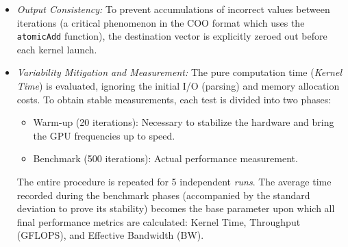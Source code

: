 \documentclass[conference]{IEEEtran}
\begin{document}
\begin{itemize}
    \item \textit{Output Consistency:} To prevent accumulations of incorrect values between iterations (a critical phenomenon in the COO format which uses the \texttt{atomicAdd} function), the destination vector is explicitly zeroed out before each kernel launch.
    
    \item \textit{Variability Mitigation and Measurement:} The pure computation time (\textit{Kernel Time}) is evaluated, ignoring the initial I/O (parsing) and memory allocation costs. To obtain stable measurements, each test is divided into two phases:
    \begin{itemize}
        \item Warm-up (20 iterations): Necessary to stabilize the hardware and bring the GPU frequencies up to speed.
        \item Benchmark (500 iterations): Actual performance measurement.
    \end{itemize}
    The entire procedure is repeated for 5 independent \textit{runs}. The average time recorded during the benchmark phases (accompanied by the standard deviation to prove its stability) becomes the base parameter upon which all final performance metrics are calculated: Kernel Time, Throughput (GFLOPS), and Effective Bandwidth (BW).
\end{itemize}
\end{document}
